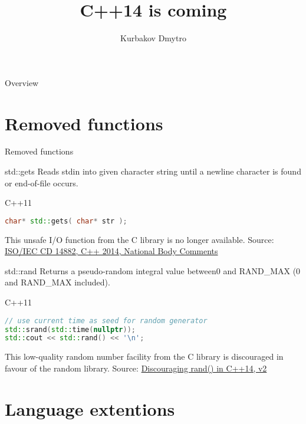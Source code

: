 \documentclass{beamer}
\title{C++14 is coming}
\author{Kurbakov Dmytro}
\begin{document}
\begin{frame}
\titlepage
\end{frame}

\begin{frame}{Overview}
\tableofcontents
\end{frame}


\section{Removed functions}

\begin{frame}
\begin{center}
\huge Removed functions
\end{center}
\end{frame}

\begin{frame}[fragile]{std::gets}
Reads stdin into given character string until a newline character is found or end-of-file occurs.
\begin{block}{C++11}
\begin{lstlisting}[firstnumber=1, label=glabels, xleftmargin=5pt, language=C++] 
char* std::gets( char* str );
\end{lstlisting}
\end{block}
This unsafe I/O function from the C library is no longer available.
\vfill
Source: \href{http://www.open-std.org/jtc1/sc22/wg21/docs/papers/2013/n3733.pdf}{ISO/IEC CD 14882, C++ 2014, National Body Comments }
\end{frame}

\begin{frame}[fragile]{std::rand}
Returns a pseudo-random integral value between ​0​ and RAND\_MAX (0 and RAND\_MAX included).
\begin{block}{C++11}
\begin{lstlisting}[firstnumber=1, label=glabels, xleftmargin=5pt, language=C++] 
// use current time as seed for random generator
std::srand(std::time(nullptr));
std::cout << std::rand() << '\n';
\end{lstlisting}
\end{block}
This low-quality random number facility from the C library is discouraged in favour of the random library.
\vfill
Source: \href{http://www.open-std.org/jtc1/sc22/wg21/docs/papers/2014/n3924.pdf}{Discouraging rand() in C++14, v2}
\end{frame}

\section{Language extentions}
\end{document}
